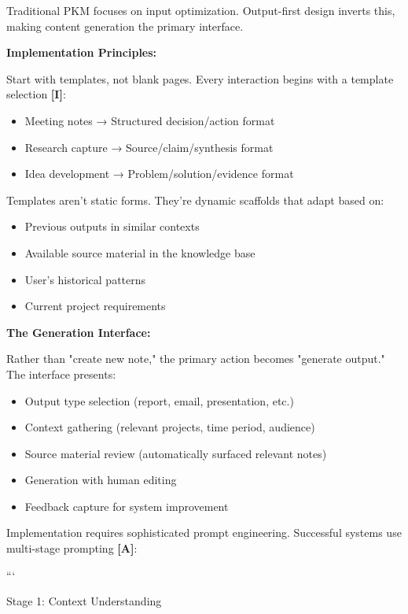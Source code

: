 \documentclass[a4paper,11pt]{article}
\newcommand{\ilabel}{\textbf{\textcolor{icolor}{[I]}}}
\newcommand{\alabel}{\textbf{\textcolor{acolor}{[A]}}}
\begin{document}
Traditional PKM focuses on input optimization. Output-first design inverts this, making content generation the primary interface.


\textbf{Implementation Principles:}\par

Start with templates, not blank pages. Every interaction begins with a template selection \ilabel{}:

\begin{itemize}
  \item Meeting notes → Structured decision/action format
  \item Research capture → Source/claim/synthesis format
  \item Idea development → Problem/solution/evidence format
\end{itemize}

Templates aren't static forms. They're dynamic scaffolds that adapt based on:

\begin{itemize}
  \item Previous outputs in similar contexts
  \item Available source material in the knowledge base
  \item User's historical patterns
  \item Current project requirements
\end{itemize}

\textbf{The Generation Interface:}\par

Rather than "create new note," the primary action becomes "generate output." The interface presents:

\begin{itemize}
  \item Output type selection (report, email, presentation, etc.)
  \item Context gathering (relevant projects, time period, audience)
  \item Source material review (automatically surfaced relevant notes)
  \item Generation with human editing
  \item Feedback capture for system improvement
\end{itemize}

Implementation requires sophisticated prompt engineering. Successful systems use multi-stage prompting \alabel{}:


```

Stage 1: Context Understanding
\end{document}
